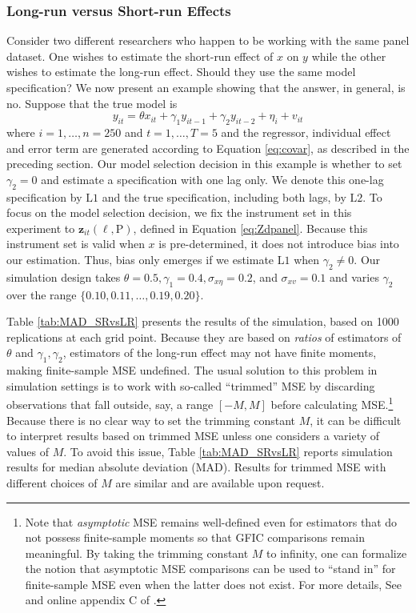 \subsubsection{Long-run versus Short-run Effects}
\label{sec:SRvsLR}
Consider two different researchers who happen to be working with the same panel dataset. 
One wishes to estimate the short-run effect of $x$ on $y$ while the other wishes to estimate the long-run effect.  
Should they use the same model specification?
We now present an example showing that the answer, in general, is no.
Suppose that the true model is
\[
  y_{it} = \theta x_{it} + \gamma_1 y_{it-1} + \gamma_2 y_{it-2}  + \eta_i + v_{it}
\]
where $i = 1, \dots, n = 250$ and $t = 1, \dots, T=5$ and the regressor, individual effect and error term are generated according to Equation \ref{eq:covar}, as described in the preceding section.
Our model selection decision in this example is whether to set $\gamma_2 = 0$ and estimate a specification with one lag only.
We denote this one-lag specification by $\mbox{L1}$ and the true specification, including both lags, by $\mbox{L2}$.
To focus on the model selection decision, we fix the instrument set in this experiment to $\mathbf{z}_{it}(\ell,\text{P})$, defined in Equation \ref{eq:Zdpanel}.
Because this instrument set is valid when $x$ is pre-determined, it does not introduce bias into our estimation.
Thus, bias only emerges if we estimate $\mbox{L1}$ when $\gamma_2\neq 0$.
Our simulation design takes $\theta = 0.5, \gamma_1 = 0.4, \sigma_{x\eta} = 0.2$, and $\sigma_{xv} = 0.1$ and varies $\gamma_2$ over the range $\{0.10, 0.11, \dots, 0.19, 0.20\}$. 

Table \ref{tab:MAD_SRvsLR} presents the results of the simulation, based on 1000 replications at each grid point.
Because they are based on \emph{ratios} of estimators of $\theta$ and $\gamma_1, \gamma_2$, estimators of the long-run effect may not have finite moments, making finite-sample MSE undefined.
The usual solution to this problem in simulation settings is to work with so-called ``trimmed'' MSE by discarding observations that fall outside, say, a range $[-M, M]$ before calculating MSE.\footnote{Note that \emph{asymptotic} MSE remains well-defined even for estimators that do not possess finite-sample moments so that GFIC comparisons remain meaningful. By taking the trimming constant $M$ to infinity, one can formalize the notion that asymptotic MSE comparisons can be used to ``stand in'' for finite-sample MSE even when the latter does not exist. For more details, See \cite{HansenShrink} and online appendix C of \cite{DiTraglia2016}.}
Because there is no clear way to set the trimming constant $M$, it can be difficult to interpret results based on trimmed MSE unless one considers a variety of values of $M$. 
To avoid this issue, Table \ref{tab:MAD_SRvsLR} reports simulation results for median absolute deviation (MAD).
Results for trimmed MSE with different choices of $M$ are similar and are available upon request.

